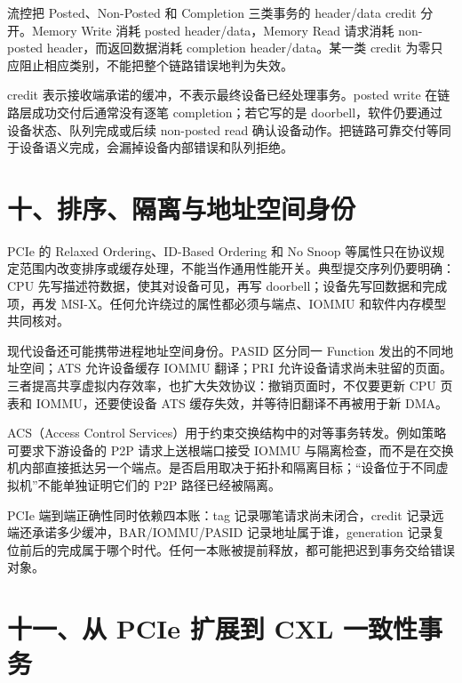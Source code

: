 
流控把 Posted、Non-Posted 和 Completion 三类事务的 header/data credit 分开。Memory Write 消耗 posted header/data，Memory Read 请求消耗 non-posted header，而返回数据消耗 completion header/data。某一类 credit 为零只应阻止相应类别，不能把整个链路错误地判为失效。

credit 表示接收端承诺的缓冲，不表示最终设备已经处理事务。posted write 在链路层成功交付后通常没有逐笔 completion；若它写的是 doorbell，软件仍要通过设备状态、队列完成或后续 non-posted read 确认设备动作。把链路可靠交付等同于设备语义完成，会漏掉设备内部错误和队列拒绝。

\section{十、排序、隔离与地址空间身份}

PCIe 的 Relaxed Ordering、ID-Based Ordering 和 No Snoop 等属性只在协议规定范围内改变排序或缓存处理，不能当作通用性能开关。典型提交序列仍要明确：CPU 先写描述符数据，使其对设备可见，再写 doorbell；设备先写回数据和完成项，再发 MSI-X。任何允许绕过的属性都必须与端点、IOMMU 和软件内存模型共同核对。

现代设备还可能携带进程地址空间身份。PASID 区分同一 Function 发出的不同地址空间；ATS 允许设备缓存 IOMMU 翻译；PRI 允许设备请求尚未驻留的页面。三者提高共享虚拟内存效率，也扩大失效协议：撤销页面时，不仅要更新 CPU 页表和 IOMMU，还要使设备 ATS 缓存失效，并等待旧翻译不再被用于新 DMA。

ACS（Access Control Services）用于约束交换结构中的对等事务转发。例如策略可要求下游设备的 P2P 请求上送根端口接受 IOMMU 与隔离检查，而不是在交换机内部直接抵达另一个端点。是否启用取决于拓扑和隔离目标；“设备位于不同虚拟机”不能单独证明它们的 P2P 路径已经被隔离。

\begin{keyidea}
PCIe 端到端正确性同时依赖四本账：tag 记录哪笔请求尚未闭合，credit 记录远端还承诺多少缓冲，BAR/IOMMU/PASID 记录地址属于谁，generation 记录复位前后的完成属于哪个时代。任何一本账被提前释放，都可能把迟到事务交给错误对象。
\end{keyidea}








\section{十一、从 PCIe 扩展到 CXL 一致性事务}

